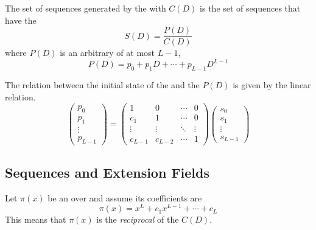 \begin{theorem}\label{thm:D_Transform_Connection_Polynomial_Relation}
  The set of sequences generated by the  with  $C(D)$ is the set of sequences that have the 
  \begin{equation}\label{eq:D_Transform_Sequence_Connection_Polynomial_Relation}
    S(D) = \frac{P(D)}{C(D)}
  \end{equation}
  where $P(D)$ is an arbitrary  of  at most $L-1$,
  \begin{equation}\label{eq:P_Polynomial}
    P(D) = p_{0} + p_{1}D + \cdots + p_{L-1}D^{L-1}
  \end{equation}

  The relation between the initial state of the  and the $P(D)$  is given by the linear relation.
  \begin{equation*}
    \begin{pmatrix}
      p_{0} \\
      p_{1} \\
      \vdots \\
      p_{L-1}
    \end{pmatrix}
     =
     \begin{pmatrix}
       1 & 0 & \cdots & 0 \\
       c_{1} & 1 & \cdots & 0 \\
       \vdots & \vdots & \ddots & \vdots \\
       c_{L-1} & c_{L-2} & \cdots & 1
     \end{pmatrix}
     \begin{pmatrix}
       s_{0} \\
       s_{1} \\
       \vdots \\
       s_{L-1}
     \end{pmatrix}
  \end{equation*}
\end{theorem}

\subsection{ Sequences and Extension Fields}\label{LFSR_Sequences_Extension_Fields}
Let $\pi(x)$ be an   over  and assume its coefficients are
\begin{equation}\label{eq:Reciprocal_Connection_Polynomial}
  \pi(x) = x^{L} + c_{1}x^{L-1} + \cdots + c_{L}
\end{equation}
This means that $\pi(x)$ is the \emph{reciprocal}  of the  $C(D)$.

